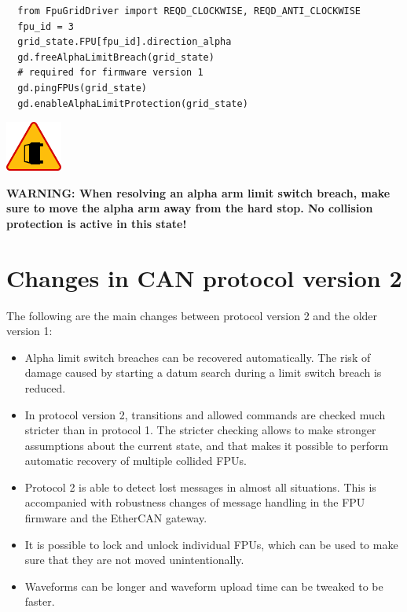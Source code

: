 \documentclass[fontsize=12,a4paper]{scrreprt}
\newenvironment{warning}{\begin{framed}\includegraphics[width=5em]{accident-area-ahead.png}
}{\end{framed}}
\begin{document}
\begin{verbatim}
  from FpuGridDriver import REQD_CLOCKWISE, REQD_ANTI_CLOCKWISE
  fpu_id = 3
  grid_state.FPU[fpu_id].direction_alpha
  gd.freeAlphaLimitBreach(grid_state)
  # required for firmware version 1
  gd.pingFPUs(grid_state)
  gd.enableAlphaLimitProtection(grid_state)
\end{verbatim}



\begin{warning}
  \textbf{WARNING: When resolving an alpha arm limit switch breach,
    make sure to move the alpha arm away from the hard stop.  No
    collision protection is active in this state!}
\end{warning}

\section{Changes in CAN protocol version 2}
The following are the main changes between protocol version 2
and the older version 1:

\begin{itemize}
\item Alpha limit switch breaches can be recovered automatically. The
  risk of damage caused by starting a datum search during a limit
  switch breach is reduced.


\item In protocol version 2, transitions and allowed commands are
  checked much stricter than in protocol 1.  The stricter checking
  allows to make stronger assumptions about the current state, and
  that makes it possible to perform automatic recovery of multiple
  collided FPUs.

\item Protocol 2 is able to detect lost messages in almost all
  situations. This is accompanied with robustness changes of message
  handling in the FPU firmware and the EtherCAN gateway.


\item It is possible to lock and unlock individual FPUs, which can be
  used to make sure that they are not moved unintentionally.

\item Waveforms can be longer and waveform upload time can be tweaked
  to be faster.

\end{itemize}
\end{document}
